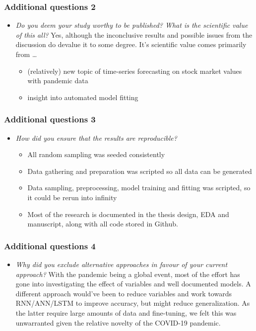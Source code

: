 \documentclass[aspectratio=169,classic]{uva-inf-presentation}
\begin{document}
\begin{frame}
\frametitle{Additional questions 2}
\begin{itemize}
    \item \textit{Do you deem your study worthy to be published? What is the scientific value of this all?} \newline
    Yes, although the inconclusive results and possible issues from the discussion do devalue it to some degree. It's scientific value comes primarily from \ldots
    \begin{itemize}
        \item (relatively) new topic of time-series forecasting on stock market values with pandemic data
        \item insight into automated model fitting
    \end{itemize}
\end{itemize}
\end{frame}

\begin{frame}
\frametitle{Additional questions 3}
\begin{itemize}
    \item \textit{How did you ensure that the results are reproducible?} \newline
    \begin{itemize}
        \item All random sampling was seeded consistently
        \item Data gathering and preparation was scripted so all data can be generated
        \item Data sampling, preprocessing, model training and fitting was scripted, so it could be rerun into infinity
        \item Most of the research is documented in the thesis design, EDA and manuscript, along with all code stored in Github.
    \end{itemize}
\end{itemize}
\end{frame}

\begin{frame}
\frametitle{Additional questions 4}
\begin{itemize}
    \item \textit{Why did you exclude alternative approaches in favour of your current approach?} \newline
    With the pandemic being a global event, most of the effort has gone into investigating the effect of variables and well documented models. A different approach would've been to reduce variables and work towards RNN/ANN/LSTM to improve accuracy, but might reduce generalization. As the latter require large amounts of data and fine-tuning, we felt this was unwarranted given the relative novelty of the COVID-19 pandemic.
\end{itemize}
\end{frame}
\end{document}
